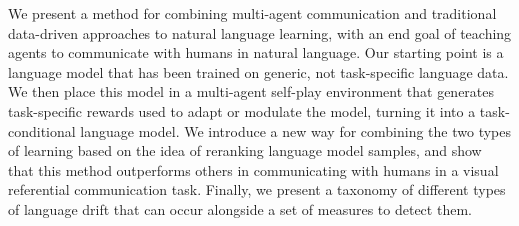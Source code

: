 We present a method for combining multi-agent communication and traditional data-driven approaches to natural language learning, with an end goal of teaching agents to communicate with humans in natural language.  Our starting point is a language model that has been trained on generic, not task-specific language data. We then place this model in a multi-agent self-play environment that generates task-specific rewards used to adapt or modulate the model, turning it into a task-conditional language model. We introduce a new way for combining the two types of learning based on the idea of reranking language model samples, and show that this method outperforms others in communicating with humans in a visual referential communication task. Finally, we present a taxonomy of different types of language drift that can occur alongside a set of measures to detect them.
